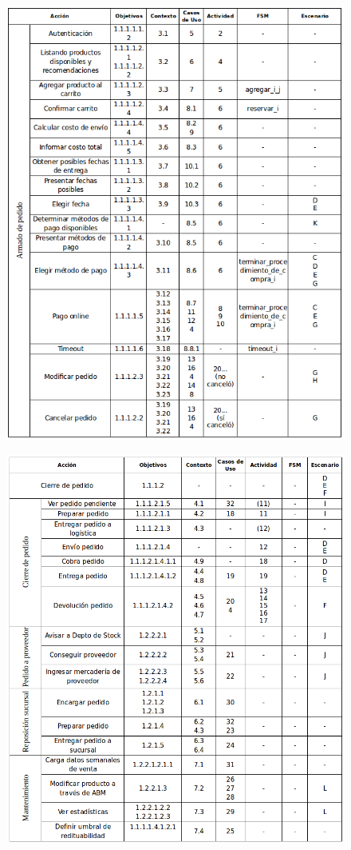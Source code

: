 \begin{figure}[H]
	\begin{center}
	\includegraphics[width=\textwidth]{imagenes/trazabilidad-armado-pedido.png}
	\end{center}
	\label{trazabilidad-armado-pedido}
\end{figure}

\begin{figure}[H]
	\begin{center}
	\includegraphics[width=\textwidth]{imagenes/trazabilidad-otros.png}
	\end{center}
	\label{trazabilidad-otros}
\end{figure}

